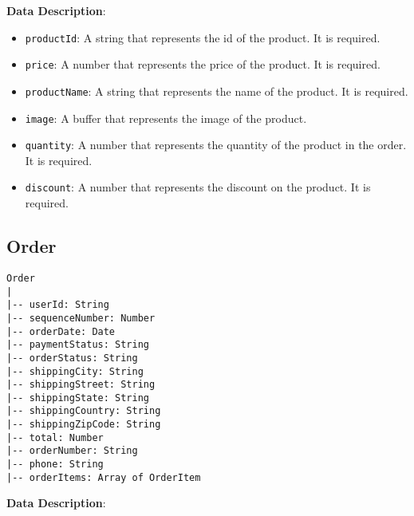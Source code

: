 \textbf{Data Description}:

\begin{itemize}
    \item \texttt{productId}: A string that represents the id of the product. It is required.
    \item \texttt{price}: A number that represents the price of the product. It is required.
    \item \texttt{productName}: A string that represents the name of the product. It is required.
    \item \texttt{image}: A buffer that represents the image of the product.
    \item \texttt{quantity}: A number that represents the quantity of the product in the order. It is required.
    \item \texttt{discount}: A number that represents the discount on the product. It is required.
\end{itemize}

\subsection{Order}

\begin{verbatim}
Order
|
|-- userId: String
|-- sequenceNumber: Number
|-- orderDate: Date
|-- paymentStatus: String
|-- orderStatus: String
|-- shippingCity: String
|-- shippingStreet: String
|-- shippingState: String
|-- shippingCountry: String
|-- shippingZipCode: String
|-- total: Number
|-- orderNumber: String
|-- phone: String
|-- orderItems: Array of OrderItem
\end{verbatim}

\textbf{Data Description}:

